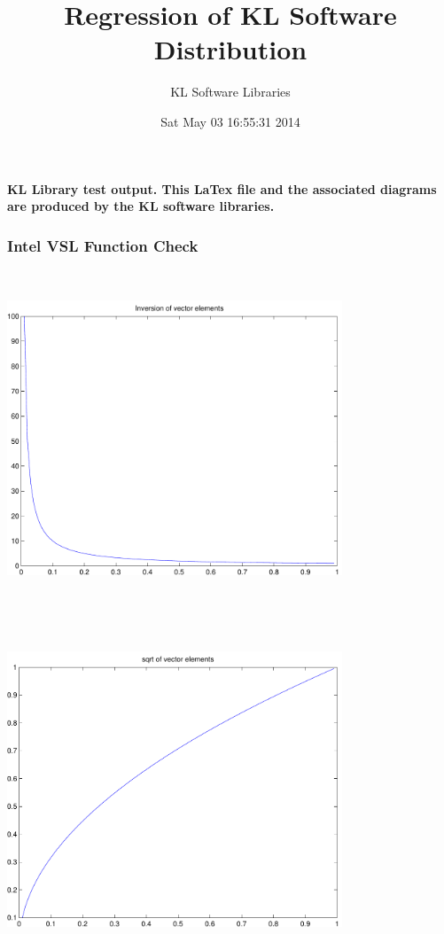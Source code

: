 \documentclass[9pt]{article}
\theoremstyle{plain}
\theoremstyle{definition}
\theoremstyle{remark}
\numberwithin{equation}{section}
\begin{document}
\title{Regression of KL Software Distribution   }
\author{KL Software Libraries}
\date{Sat May 03 16:55:31 2014
}
\maketitle
\textbf{ KL Library test output.  This LaTex file and the associated diagrams are produced by the KL software libraries.}
\subsubsection{Intel VSL Function Check}
\includegraphics[width=10.0cm,height=10.0cm]{klVSLInv.pdf}

\includegraphics[width=10.0cm,height=10.0cm]{klVSLSqrt.pdf}
\end{document}
